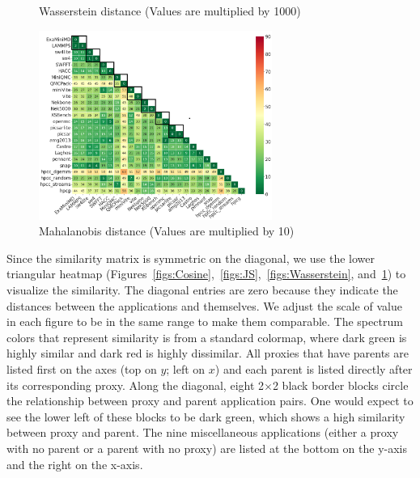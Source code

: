 \begin{figure}[htbp]
\begin{minipage}[t]{0.48\textwidth}
	\vspace*{-5mm}
	\caption{Wasserstein distance (Values are multiplied by 1000)}
	\label{figs:Wasserstein}
	\end{minipage}
\hspace{.1in}	
\begin{minipage}[t]{0.48\textwidth}
	\centering
	\includegraphics[width=3in]{figs/Mahalanobis distance_m10.png}
	\vspace*{-5mm}
	\caption{Mahalanobis distance (Values are multiplied by 10)}
	\label{figs:Mahalanobis}
	\end{minipage}
\hspace{.1in}
\end{figure}

Since the similarity matrix is symmetric on the diagonal, we use the lower triangular heatmap (Figures~\ref{figs:Cosine},~\ref{figs:JS},~\ref{figs:Wasserstein}, and~\ref{figs:Mahalanobis}) to visualize the similarity. The diagonal entries are zero because they indicate the distances between the applications and themselves. We adjust the scale of value in each figure to be in the same range to make them comparable. The spectrum colors that represent similarity is from a standard colormap, where dark green is highly similar and dark red is highly dissimilar. All proxies that have parents are listed first on the axes (top on $y$; left on $x$) and each parent is listed directly after its corresponding proxy. Along the diagonal, eight 2$\times$2 black border blocks circle the relationship between proxy and parent application pairs. One would expect to see the lower left of these blocks to be dark green, which shows a high similarity between proxy and parent. The nine miscellaneous applications (either a proxy with no parent or a parent with no proxy) are listed at the bottom on the y-axis and the right on the x-axis. 

